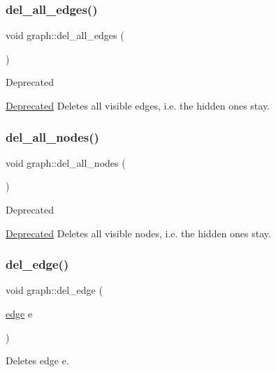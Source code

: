 \subsubsection{\texorpdfstring{del\+\_\+all\+\_\+edges()}{del\_all\_edges()}}
{\footnotesize\ttfamily void graph\+::del\+\_\+all\+\_\+edges (\begin{DoxyParamCaption}{ }\end{DoxyParamCaption})}

\begin{DoxyRefDesc}{Deprecated}
\item[\mbox{\hyperlink{deprecated__deprecated000002}{Deprecated}}]Deletes all visible edges, i.\+e. the hidden ones stay. \end{DoxyRefDesc}
\mbox{\label{classgraph_ad0ca1578643a51f96a76a846f14558df}} 
\subsubsection{\texorpdfstring{del\+\_\+all\+\_\+nodes()}{del\_all\_nodes()}}
{\footnotesize\ttfamily void graph\+::del\+\_\+all\+\_\+nodes (\begin{DoxyParamCaption}{ }\end{DoxyParamCaption})}

\begin{DoxyRefDesc}{Deprecated}
\item[\mbox{\hyperlink{deprecated__deprecated000001}{Deprecated}}]Deletes all visible nodes, i.\+e. the hidden ones stay. \end{DoxyRefDesc}
\mbox{\label{classgraph_ad9356508c49c542dfd4b7169297387c6}} 
\subsubsection{\texorpdfstring{del\+\_\+edge()}{del\_edge()}}
{\footnotesize\ttfamily void graph\+::del\+\_\+edge (\begin{DoxyParamCaption}\item[{\mbox{\hyperlink{classedge}{edge}}}]{e }\end{DoxyParamCaption})}

Deletes edge {\ttfamily e}.

